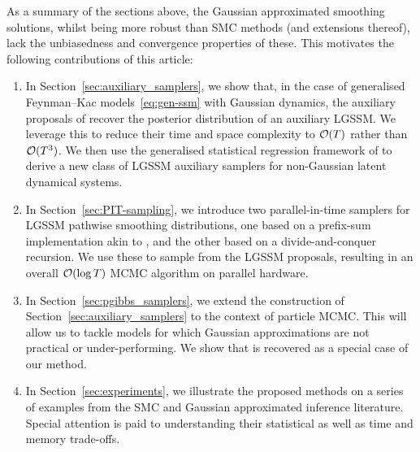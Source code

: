 As a summary of the sections above, the Gaussian approximated smoothing solutions, whilst being more robust than SMC methods (and extensions thereof), lack the unbiasedness and convergence properties of these. This motivates the following contributions of this article:
\begin{enumerate}
    \item In Section~\ref{sec:auxiliary_samplers}, we show that, in the case of generalised Feynman--Kac models~\eqref{eq:gen-ssm} with Gaussian dynamics, the auxiliary proposals of \citet{titsias2018} recover the posterior distribution of an auxiliary LGSSM. We leverage this to reduce their time and space complexity to $\mathcal{O}(T)$ rather than $\mathcal{O}(T^3)$. We then use the generalised statistical regression framework of \citet{Tronarp2018iterative} to derive a new class of LGSSM auxiliary samplers for non-Gaussian latent dynamical systems.
    \item In Section~\ref{sec:PIT-sampling}, we introduce two parallel-in-time samplers for LGSSM pathwise smoothing distributions, one based on a prefix-sum implementation akin to \citet{Sarkka2021temporal}, and the other based on a divide-and-conquer recursion. We use these to sample from the LGSSM proposals, resulting in an overall $\mathcal{O}(\log T)$ MCMC algorithm on parallel hardware.
    \item In Section~\ref{sec:pgibbs_samplers}, we extend the construction of Section~\ref{sec:auxiliary_samplers} to the context of particle MCMC. This will allow us to tackle models for which Gaussian approximations are not practical or under-performing. We show that \citet{finke2021csmc} is recovered as a special case of our method.
    \item In Section~\ref{sec:experiments}, we illustrate the proposed methods on a series of examples from the SMC and Gaussian approximated inference literature. Special attention is paid to understanding their statistical as well as time and memory trade-offs.
\end{enumerate}